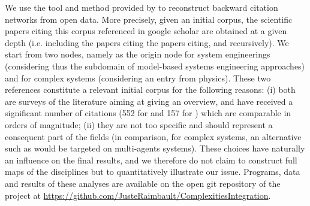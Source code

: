 \documentclass[runningheads,a4paper]{llncs}
\begin{document}

We use the tool and method provided by \cite{raimbault2017exploration} to reconstruct backward citation networks from open data. More precisely, given an initial corpus, the scientific papers citing this corpus referenced in google scholar are obtained at a given depth (i.e. including the papers citing the papers citing, and recursively). We start from two nodes, namely \cite{estefan2007survey} as the origin node for system engineerings (considering thus the subdomain of model-based systems engineering approaches) and \cite{newman2011complex} for complex systems (considering an entry from physics). These two references constitute a relevant initial corpus for the following reasons: (i) both are surveys of the literature aiming at giving an overview, and have received a significant number of citations (552 for \cite{estefan2007survey} and 157 for \cite{newman2011complex}) which are comparable in orders of magnitude; (ii) they are not too specific and should represent a consequent part of the fields (in comparison, for complex systems, an alternative such as \cite{stone2000multiagent} would be targeted on multi-agents systems). These choices have naturally an influence on the final results, and we therefore do not claim to construct full maps of the disciplines but to quantitatively illustrate our issue. Programs, data and results of these analyses are available on the open git repository of the project at \url{https://github.com/JusteRaimbault/ComplexitiesIntegration}.
\end{document}
